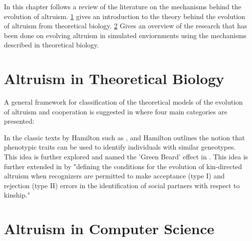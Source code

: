 \documentclass[a4paper]{book}
\begin{document}
In this chapter follows a review of the literature on the mechanisms behind the
evolution of altruism. \ref{sec:biology} gives an introduction to the theory behind the evolution of altruism from theoretical biology.  
\ref{sec:cs} Gives an overview of the research that has been done on evolving altruism in simulated enviornments using the mechanisms described in theoretical biology.

\section{Altruism in Theoretical Biology}
\label{sec:biology}
A general framework for classification of the theoretical models of the evolution of altruism and cooperation is suggested in \cite{lehmann_evolution_2006} where four main categories are presented:  

In the classic texts by Hamilton such as \cite{w._d._hamilton_evolution_1963}, \cite{hamilton_genetical_1964-1} and \cite{hamilton_genetical_1964} Hamilton outlines the notion
that phenotypic traits can be used to identify individuals with similar geneotypes. This idea is further explored and named the 'Green Beard' effect in \cite{dawkins_selfish_2006}. 
This idea is further extended in \cite{agrawal_kin_2001} by "defining the conditions for the evolution of kin-directed altruism  when recognizers are permitted to make acceptance (type I) and rejection (type II) errors in the identification of social partners with respect to kinship."

\section{Altruism in Computer Science}
\label{sec:cs}
\end{document}
